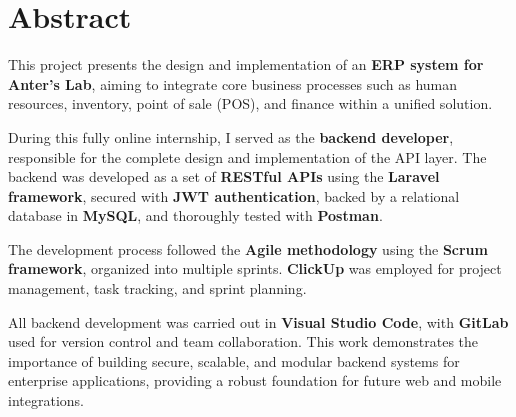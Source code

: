 \chapter*{Abstract}
This project presents the design and implementation of an \textbf{ERP system for Anter's Lab}, aiming to integrate core business processes such as human resources, inventory, point of sale (POS), and finance within a unified solution.

During this fully online internship, I served as the \textbf{backend developer}, responsible for the complete design and implementation of the API layer.  
The backend was developed as a set of \textbf{RESTful APIs} using the \textbf{Laravel framework}, secured with \textbf{JWT authentication}, backed by a relational database in \textbf{MySQL}, and thoroughly tested with \textbf{Postman}.

The development process followed the \textbf{Agile methodology} using the \textbf{Scrum framework}, organized into multiple sprints. \textbf{ClickUp} was employed for project management, task tracking, and sprint planning.  

All backend development was carried out in \textbf{Visual Studio Code}, with \textbf{GitLab} used for version control and team collaboration.  
This work demonstrates the importance of building secure, scalable, and modular backend systems for enterprise applications, providing a robust foundation for future web and mobile integrations.
